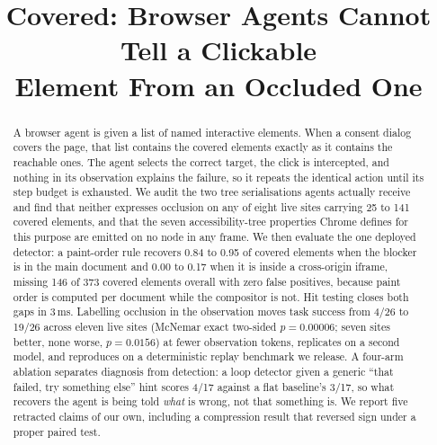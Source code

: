 \documentclass[conference]{IEEEtran}
\begin{document}
\title{Covered: Browser Agents Cannot Tell a Clickable\\Element From an Occluded One}

\author{
}

\maketitle

\begin{abstract}
A browser agent is given a list of named interactive elements. When a consent
dialog covers the page, that list contains the covered elements exactly as it
contains the reachable ones. The agent selects the correct target, the click is
intercepted, and nothing in its observation explains the failure, so it repeats
the identical action until its step budget is exhausted. We audit the two tree
serialisations agents actually receive and find that neither expresses
occlusion on any of eight live sites carrying 25 to 141 covered elements, and
that the seven accessibility-tree properties Chrome defines for this purpose
are emitted on no node in any frame. We then evaluate the one deployed
detector: a paint-order rule recovers 0.84 to 0.95 of covered elements when
the blocker is in the main document and 0.00 to 0.17 when it is inside a
cross-origin iframe, missing 146 of 373 covered elements overall with zero
false positives, because paint order is computed per document while the
compositor is not. Hit testing closes both gaps in 3\,ms. Labelling occlusion
in the observation moves task success from 4/26 to 19/26 across eleven live
sites (McNemar exact two-sided $p = 0.00006$; seven sites better, none worse,
$p = 0.0156$) at fewer observation tokens, replicates on a second model, and
reproduces on a deterministic replay benchmark we release. A four-arm ablation
separates diagnosis from detection: a loop detector given a generic ``that
failed, try something else'' hint scores 4/17 against a flat baseline's 3/17,
so what recovers the agent is being told \emph{what} is wrong, not that
something is. We report five retracted claims of our own, including a
compression result that reversed sign under a proper paired test.
\end{abstract}
\end{document}
